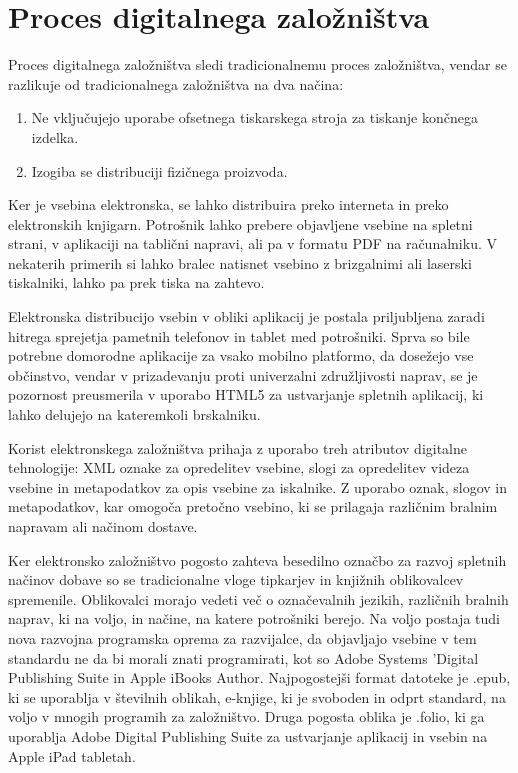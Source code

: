 \documentclass[a4paper, 12pt]{book}
\begin{document}
\section{Proces digitalnega založništva}
Proces digitalnega založništva sledi tradicionalnemu proces založništva,\cite{5} vendar se razlikuje od tradicionalnega založništva na dva načina: 
\begin{enumerate}
	\item Ne vključujejo uporabe ofsetnega tiskarskega stroja za tiskanje končnega izdelka.
	\item Izogiba se distribuciji fizičnega proizvoda.
\end{enumerate}
Ker je vsebina elektronska, se lahko distribuira preko interneta in preko elektronskih knjigarn. Potrošnik lahko prebere objavljene vsebine na spletni strani, v aplikaciji na tablični napravi, ali pa v formatu PDF na računalniku. V nekaterih primerih si lahko bralec natisnet vsebino z brizgalnimi ali laserski tiskalniki, lahko pa prek tiska na zahtevo. 

Elektronska distribucijo vsebin v obliki aplikacij je postala priljubljena zaradi hitrega sprejetja pametnih telefonov in tablet med potrošniki. Sprva so bile potrebne domorodne aplikacije za vsako mobilno platformo, da dosežejo vse občinstvo, vendar v prizadevanju proti univerzalni združljivosti naprav, se je pozornost preusmerila v uporabo HTML5 za ustvarjanje spletnih aplikacij, ki lahko delujejo na kateremkoli brskalniku. 

Korist elektronskega založništva prihaja z uporabo treh atributov digitalne tehnologije: XML oznake za opredelitev vsebine,\cite{6} slogi za opredelitev videza vsebine in metapodatkov za opis vsebine za iskalnike. Z uporabo oznak, slogov in metapodatkov, kar omogoča pretočno vsebino, ki se prilagaja različnim bralnim napravam ali načinom dostave. 

Ker elektronsko založništvo pogosto zahteva besedilno označbo za razvoj spletnih načinov dobave so se tradicionalne vloge tipkarjev in knjižnih oblikovalcev spremenile. Oblikovalci morajo vedeti več o označevalnih jezikih, različnih bralnih naprav, ki na voljo, in načine, na katere potrošniki berejo. Na voljo postaja tudi nova razvojna programska oprema za razvijalce, da objavljajo vsebine v tem standardu ne da bi morali znati programirati, kot so Adobe Systems 'Digital Publishing Suite in Apple iBooks Author. Najpogostejši format datoteke je .epub, ki se uporablja v številnih oblikah, e-knjige, ki je svoboden in odprt standard, na voljo v mnogih programih za založništvo. Druga pogosta oblika je .folio, ki ga uporablja Adobe Digital Publishing Suite za ustvarjanje aplikacij in vsebin na Apple iPad tabletah. 
\end{document}
